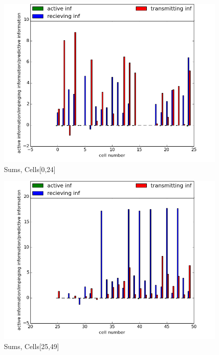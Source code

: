\documentclass{beamer}
\begin{document}
\begin{frame}
\begin{figure}
\begin{minipage}{0.495\linewidth}
\centering
\includegraphics[scale=0.29]{Active_impinging_predictive10_012501_00_010022_010_0.png}
\vfill Sums, Cells[0,24]
\end{minipage}
\begin{minipage}{0.495\linewidth}
\centering
\includegraphics[scale=0.29]{Active_impinging_predictive20_012501_00_010022_010_0.png}%
\vfill Sums, Cells[25,49]
\end{minipage}
\end{figure}
\end{frame}
\end{document}
